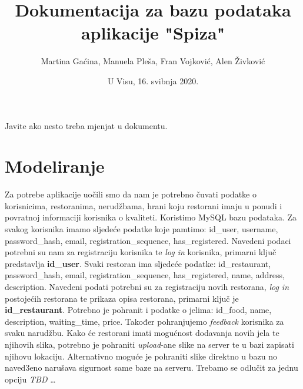 \documentclass[12pt]{scrartcl}
\begin{document}
\title{Dokumentacija za bazu podataka aplikacije "Spiza"}
\author{Martina Gaćina, Manuela Pleša, Fran Vojković, Alen Živković}
\date{U Visu, 16. svibnja 2020.}
\maketitle
\tableofcontents

\begin{napomena}
Javite ako nesto treba mjenjat u dokumentu.
\end{napomena}
\section{Modeliranje}

Za potrebe aplikacije uočili smo da nam je potrebno čuvati podatke o korisnicima, restoranima, nerudžbama, hrani koju restorani imaju u ponudi i povratnoj informaciji korisnika o kvaliteti. Koristimo MySQL bazu podataka. Za svakog korisnika imamo sljedeće podatke koje pamtimo: \textsf{id\_user}, \textsf{username}, \textsf{password\_hash}, \textsf{email}, \textsf{registration\_sequence}, \textsf{has\_registered}. Navedeni podaci potrebni su nam za registraciju korisnika te \textit{log in} korisnika, primarni ključ predstavlja \textbf{\textsf{id\_user}}. Svaki restoran ima sljedeće podatke: \textsf{id\_restaurant}, \textsf{password\_hash}, \textsf{email}, \textsf{registration\_sequence}, \textsf{has\_registered}, \textsf{name}, \textsf{address}, \textsf{description}. Navedeni podati potrebni su za registraciju novih restorana, \textit{log in }postojećih restorana te prikaza opisa restorana, primarni ključ je \textbf{\textsf{id\_restaurant}}. Potrebno je pohranit i podatke o jelima: \textsf{id\_food}, \textsf{name}, \textsf{description}, \textsf{waiting\_time}, \textsf{price}. Također pohranjujemo \textit{feedback} korisnika za svaku narudžbu. Kako će restorani imati mogućnost dodavanja novih jela te njihovih slika, potrebno je pohraniti \textit{upload}-ane slike na server te u bazi zapisati njihovu lokaciju. Alternativno moguće je pohraniti slike direktno u bazu no naved3eno narušava sigurnost same baze na serveru. Trebamo se odlučit za jednu opciju \textit{TBD} \ldots

\pagebreak[2]
\end{document}
